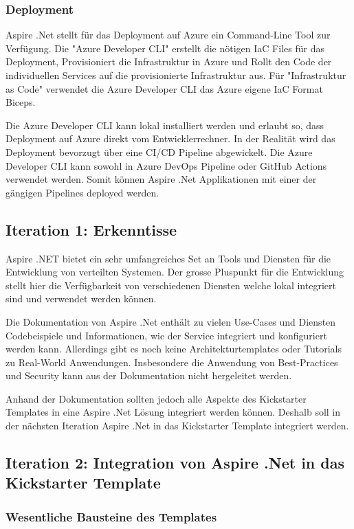         \subsubsection{Deployment}
            Aspire .Net stellt für das Deployment auf Azure ein Command-Line Tool zur Verfügung. Die "Azure Developer CLI" erstellt die nötigen IaC Files für das Deployment, Provisioniert die Infrastruktur in Azure und Rollt den Code der individuellen Services auf die provisionierte Infrastruktur aus. Für "Infrastruktur as Code" verwendet die Azure Developer CLI das Azure eigene IaC Format Biceps. 

            Die Azure Developer CLI kann lokal installiert werden und erlaubt so, dass Deployment auf Azure direkt vom Entwicklerrechner. In der Realität wird das Deployment bevorzugt über eine CI/CD Pipeline abgewickelt. Die Azure Developer CLI kann sowohl in Azure DevOps Pipeline oder GitHub Actions verwendet werden. Somit können Aspire .Net Applikationen mit einer der gängigen Pipelines deployed werden.

    \subsection{Iteration 1: Erkenntisse}
            Aspire .NET bietet ein sehr umfangreiches Set an Tools und Diensten für die Entwicklung von verteilten Systemen. Der grosse Pluspunkt für die Entwicklung stellt hier die Verfügbarkeit von verschiedenen Diensten welche lokal integriert sind und verwendet werden können.

            Die Dokumentation von Aspire .Net enthält zu vielen Use-Cases und Diensten Codebeispiele und Informationen, wie der Service integriert und konfiguriert werden kann. Allerdings gibt es noch keine Architekturtemplates oder Tutorials zu Real-World Anwendungen. Insbesondere die Anwendung von Best-Practices und Security kann aus der Dokumentation nicht hergeleitet werden.

            Anhand der Dokumentation sollten jedoch alle Aspekte des Kickstarter Templates in eine Aspire .Net Lösung integriert werden können. Deshalb soll in der nächsten Iteration Aspire .Net in das Kickstarter Template integriert werden.
            
    \subsection{Iteration 2: Integration von Aspire .Net in das Kickstarter Template}
        \subsubsection{Wesentliche Bausteine des Templates}

